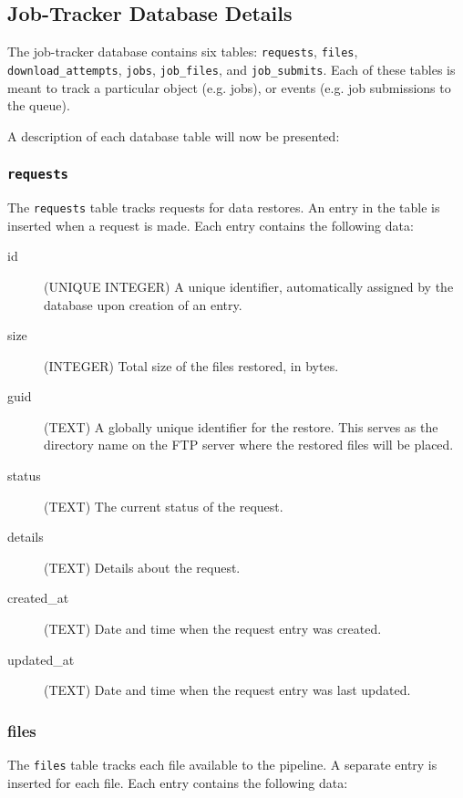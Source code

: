 \documentclass[12pt]{article}
\begin{document}
\subsection{Job-Tracker Database Details}
\label{sec:dbdetails}

The job-tracker database contains six tables: \texttt{requests}, \texttt{files}, \texttt{download\_attempts}, \texttt{jobs}, \texttt{job\_files}, and \texttt{job\_submits}. Each of these tables is meant to track a particular object (e.g. jobs), or events (e.g. job submissions to the queue).

A description of each database table will now be presented:

\subsubsection{\texttt{requests}}
The \texttt{requests} table tracks requests for data restores. An entry in the table is inserted when a request is made. Each entry contains the following data:
\begin{description}
    \item[id] (UNIQUE INTEGER) A unique identifier, automatically assigned by the database upon creation of an entry.
    \item[size] (INTEGER) Total size of the files restored, in bytes.
    \item[guid] (TEXT) A globally unique identifier for the restore. This serves as the directory name on the FTP server where the restored files will be placed.
    \item[status] (TEXT) The current status of the request.
    \item[details] (TEXT) Details about the request.
    \item[created\_at] (TEXT) Date and time when the request entry was created.
    \item[updated\_at] (TEXT) Date and time when the request entry was last updated.
\end{description}

\subsubsection{files}
The \texttt{files} table tracks each file available to the pipeline. A separate entry is inserted for each file. Each entry contains the following data:
\end{document}
